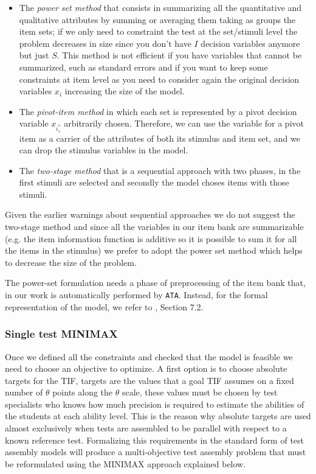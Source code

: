 \begin{itemize}
	\item The \textit{power set method} that consists in summarizing all the quantitative and qualitative attributes by summing or averaging them taking as groups the item sets; if we only need to constraint the test at the set/stimuli level the problem decreases in size since you don't have $I$ decision variables anymore but just $S$. This method is not efficient if you have variables that cannot be summarized, such as standard errors and if you want to keep some constraints at item level as you need to consider again the original decision variables $x_i$ increasing the size of the model.
	\item The \textit{pivot-item method} in which each set is represented by a pivot decision variable $x_{i^*_s}$ arbitrarily chosen. Therefore, we can use the variable for a pivot item as a carrier of the attributes of both its stimulus and item set, and we can drop the stimulus variables in the model.
	\item The \textit{two-stage method} that is a sequential approach with two phases, in the first stimuli are selected and secondly the model choses items with those stimuli.
	
\end{itemize}
Given the earlier warnings about sequential approaches we do not suggest the two-stage method and since all the variables in our item bank are summarizable (e.g. the item information function is additive so it is possible to sum it for all the items in the stimulus) we prefer to adopt the power set method which helps to decrease the size of the problem.
\par{
	The power-set formulation needs a phase of preprocessing of the item bank that, in our work is automatically performed by \texttt{ATA}.
	Instead, for the formal representation of the model, we refer to \cite{VanDerLinden2005}, Section 7.2.
}

\subsubsection{Single test MINIMAX}\label{sec:single-test-minimax}
Once we defined all the constraints and checked that the model is feasible we need to choose an objective to optimize. A first option is to choose absolute targets for the TIF, targets are the values that a goal TIF assumes on a fixed number of $\theta$ points along the $\theta$ scale, these values must be chosen by test specialists who knows how much precision is required to estimate the abilities of the students at each ability level. This is the reason why absolute targets are used almost exclusively when tests are assembled to be parallel with respect to a known reference test. Formalizing this requirements in the standard form of test assembly models will produce a multi-objective test assembly problem that must be reformulated using the MINIMAX approach explained below.


